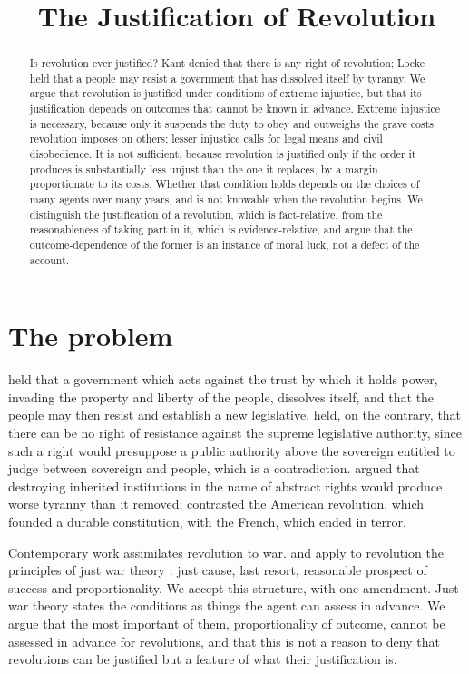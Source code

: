 \documentclass{situationist-preprint}
\title{The Justification of Revolution}
\begin{document}
\maketitle

\begin{abstract}
Is revolution ever justified? Kant denied that there is any right of revolution; Locke held that a people may resist a government that has dissolved itself by tyranny. We argue that revolution is justified under conditions of extreme injustice, but that its justification depends on outcomes that cannot be known in advance. Extreme injustice is necessary, because only it suspends the duty to obey and outweighs the grave costs revolution imposes on others; lesser injustice calls for legal means and civil disobedience. It is not sufficient, because revolution is justified only if the order it produces is substantially less unjust than the one it replaces, by a margin proportionate to its costs. Whether that condition holds depends on the choices of many agents over many years, and is not knowable when the revolution begins. We distinguish the justification of a revolution, which is fact-relative, from the reasonableness of taking part in it, which is evidence-relative, and argue that the outcome-dependence of the former is an instance of moral luck, not a defect of the account.
\end{abstract}

\section{The problem}

\citet[§§211--243]{Locke1689} held that a government which acts against the trust by which it holds power, invading the property and liberty of the people, dissolves itself, and that the people may then resist and establish a new legislative. \citet[Doctrine of Right, General Remark~A]{Kant1797} held, on the contrary, that there can be no right of resistance against the supreme legislative authority, since such a right would presuppose a public authority above the sovereign entitled to judge between sovereign and people, which is a contradiction. \citet{Burke1790} argued that destroying inherited institutions in the name of abstract rights would produce worse tyranny than it removed; \citet{Arendt1963} contrasted the American revolution, which founded a durable constitution, with the French, which ended in terror.

Contemporary work assimilates revolution to war. \citet{Buchanan2013} and \citet{Finlay2015} apply to revolution the principles of just war theory \citep{Walzer1977}: just cause, last resort, reasonable prospect of success and proportionality. We accept this structure, with one amendment. Just war theory states the conditions as things the agent can assess in advance. We argue that the most important of them, proportionality of outcome, cannot be assessed in advance for revolutions, and that this is not a reason to deny that revolutions can be justified but a feature of what their justification is.
\end{document}
